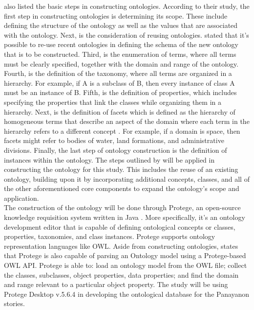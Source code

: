  also listed the basic steps in constructing ontologies. According to their study, the first step in constructing ontologies is determining its scope. These include defining the structure of the ontology as well as the values that are associated with the ontology. Next, is the consideration of reusing ontologies.  stated that it’s possible to re-use recent ontologies in defining the schema of the new ontology that is to be constructed. Third, is the enumeration of terms, where all terms must be clearly specified, together with the domain and range of the ontology. Fourth, is the definition of the taxonomy, where all terms are organized in a hierarchy. For example, if A is a subclass of B, then every instance of class A must be an instance of B. Fifth, is the definition of properties, which includes specifying the properties that link the classes while organizing them in a hierarchy. Next, is the definition of facets which is defined as the hierarchy of homogeneous terms that describe an aspect of the domain where each term in the hierarchy refers to a different concept \cite{giunchiglia2012facet}. For example, if a domain is space, then facets might refer to bodies of water, land formations, and administrative divisions. Finally, the last step of ontology construction is the definition of instances within the ontology. The steps outlined by  will be applied in constructing the ontology for this study. This includes the reuse of an existing ontology, building upon it by incorporating additional concepts, classes, and all of the other aforementioned core components  to expand the ontology’s scope and application.\\

The construction of the ontology will be done through Protege,  an open-source knowledge requisition system written in Java \cite{yadav2016development, jain2013ontology}. More specifically, it's an ontology development editor that is capable of defining ontological concepts or classes, properties, taxonomies, and class instances. Protege supports ontology representation languages like OWL. Aside from constructing ontologies,  states that Protege is also capable of parsing an Ontology model using a Protege-based OWL API. Protege is able to: load an ontology model from the OWL file; collect the classes, subclasses, object properties, data properties; and find the domain and range relevant to a particular object property. The study will be using Protege Desktop v.5.6.4 in developing the ontological database for the Panayanon stories. 

